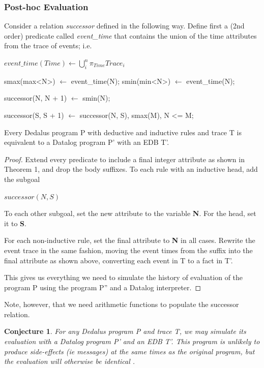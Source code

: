 \subsubsection{Post-hoc Evaluation}

Consider a relation \emph{successor} defined in the following way.
Define first a (2nd order) predicate called \emph{event\_time} 
that contains the union of the time attributes from the trace of events; i.e.

$event\_time(Time) \leftarrow \displaystyle\bigcup_{i}^n \pi_{Time}Trace_{i}$

\begin{Dedalus}
smax(max<N>) \(\leftarrow\) event\_time(N);
smin(min<N>) \(\leftarrow\) event\_time(N);

successor(N, N + 1) \(\leftarrow\) smin(N);

successor(S, S + 1) \(\leftarrow\) 
    successor(N, S),
    smax(M),
    N <= M;
\end{Dedalus}


\begin{theorem}
Every Dedalus program P with deductive and inductive rules and trace T is equivalent to a Datalog program P' with an EDB T'.
\end{theorem}

\begin{proof}

Extend every predicate to include a final integer attribute as shown in Theorem 1, and drop the body suffixes.  To each rule 
with an inductive head, add the subgoal 

$successor(N, S)$

To each other subgoal, set the new attribute to the variable \textbf{N}.  For the head, set it to \textbf{S}.  

For each non-inductive rule, set the final attribute to \textbf{N} in all cases.  Rewrite the event trace in the same fashion, 
moving the event times from the suffix into the final attribute as shown above, converting each event in T to a fact in T'.


This gives us everything we need to simulate the history of evaluation of the program P using the program P'' and a Datalog interpreter.

\end{proof}

Note, however, that we need arithmetic functions to populate the successor relation.

\newtheorem{conjecture}{Conjecture}
\begin{conjecture}
For any Dedalus program P and trace T, we may simulate its evaluation with a Datalog program P' and an EDB T'.  This program
is unlikely to produce side-effects (ie messages) at the same times as the original program, but the evaluation will otherwise be identical .
\end{conjecture}


